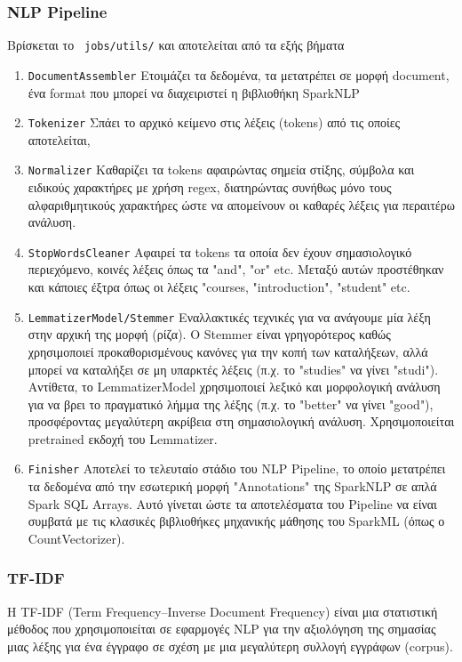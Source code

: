 \documentclass[a4paper,12pt]{article}
\begin{document}
\subsubsection{NLP Pipeline}
Βρίσκεται το \texttt{~jobs/utils/} και αποτελείται από τα εξής βήματα
\begin{enumerate}
    \item \texttt{DocumentAssembler} Ετοιμάζει τα δεδομένα, τα μετατρέπει σε μορφή document, ένα format που μπορεί να διαχειριστεί η βιβλιοθήκη SparkNLP
    \item \texttt{Tokenizer} Σπάει το αρχικό κείμενο στις λέξεις (tokens) από τις οποίες αποτελείται, 
    \item \texttt{Normalizer} Καθαρίζει τα tokens αφαιρώντας σημεία στίξης, σύμβολα και ειδικούς χαρακτήρες με χρήση regex, διατηρώντας συνήθως μόνο τους αλφαριθμητικούς χαρακτήρες ώστε να απομείνουν οι καθαρές λέξεις για περαιτέρω ανάλυση.
    \item \texttt{StopWordsCleaner} Αφαιρεί τα tokens τα οποία δεν έχουν σημασιολογικό περιεχόμενο, κοινές λέξεις όπως τα "and", "or" etc. Μεταξύ αυτών προστέθηκαν και κάποιες έξτρα όπως οι λέξεις "courses, "introduction", "student" etc.
    \item \texttt{LemmatizerModel/Stemmer} Εναλλακτικές τεχνικές για να ανάγουμε μία λέξη στην αρχική της μορφή (ρίζα). Ο Stemmer είναι γρηγορότερος καθώς χρησιμοποιεί προκαθορισμένους κανόνες για την κοπή των καταλήξεων, αλλά μπορεί να καταλήξει σε μη υπαρκτές λέξεις (π.χ. το "studies" να γίνει "studi"). Αντίθετα, το LemmatizerModel χρησιμοποιεί λεξικό και μορφολογική ανάλυση για να βρει το πραγματικό λήμμα της λέξης (π.χ. το "better" να γίνει "good"), προσφέροντας μεγαλύτερη ακρίβεια στη σημασιολογική ανάλυση. Χρησιμοποιείται pretrained εκδοχή του Lemmatizer.
    \item \texttt{Finisher} Αποτελεί το τελευταίο στάδιο του NLP Pipeline, το οποίο μετατρέπει τα δεδομένα από την εσωτερική μορφή "Annotations" της SparkNLP σε απλά Spark SQL Arrays. Αυτό γίνεται ώστε τα αποτελέσματα του Pipeline να είναι συμβατά με τις κλασικές βιβλιοθήκες μηχανικής μάθησης του SparkML (όπως ο CountVectorizer).
\end{enumerate}

\subsubsection{TF-IDF}
Η TF-IDF (Term Frequency–Inverse Document Frequency) είναι μια στατιστική μέθοδος που χρησιμοποιείται σε εφαρμογές ΝLP για την αξιολόγηση της σημασίας μιας λέξης για ένα έγγραφο σε σχέση με μια μεγαλύτερη συλλογή εγγράφων (corpus). 
\end{document}
